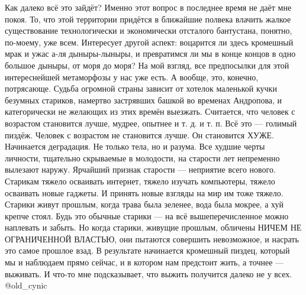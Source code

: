 Как далеко всё это зайдёт?
Именно этот вопрос в последнее время не даёт мне покоя.
То, что этой территории придётся в ближайшие полвека влачить жалкое существование технологически и экономически отсталого бантустана, понятно, по-моему, уже всем.
Интересует другой аспект: воцарится ли здесь кромешный мрак и ужас а-ля дыныры-лыныры, и превратимся ли мы в конце концов в одно большое дыныры, от моря до моря?
На мой взгляд, все предпосылки для этой интереснейшей метаморфозы у нас уже есть.
А вообще, это, конечно, потрясающе.
Судьба огромной страны зависит от хотелок маленькой кучки безумных стариков, намертво застрявших башкой во временах Андропова, и категорически не желающих из этих времён выезжать.
Считается, что человек с возрастом становится лучше, мудрее, опытнее и т. д. и т. п.
Всё это — голимый пиздёж.
Человек с возрастом не становится лучше.
Он становится ХУЖЕ.
Начинается деградация.
Не только тела, но и разума.
Все худшие черты личности, тщательно скрываемые в молодости, на старости лет непременно вылезают наружу.
Ярчайший признак старости — неприятие всего нового.
Старикам тяжело осваивать интернет, тяжело изучать компьютеры, тяжело осваивать новые гаджеты.
И принять новые взгляды на мир им тоже тяжело.
Старики живут прошлым, когда трава была зеленее, вода была мокрее, а хуй крепче стоял.
Будь это обычные старики — на всё вышеперечисленное можно наплевать и забыть.
Но когда старики, живущие прошлым, обличены НИЧЕМ НЕ ОГРАНИЧЕННОЙ ВЛАСТЬЮ, они пытаются совершить невозможное, и насрать это самое прошлое взад.
В результате начинается кромешный пиздец, который мы и наблюдаем прямо сейчас, и в котором нам предстоит жить, а точнее — выживать.
И что-то мне подсказывает, что выжить получится далеко не у всех.
@old_cynic

